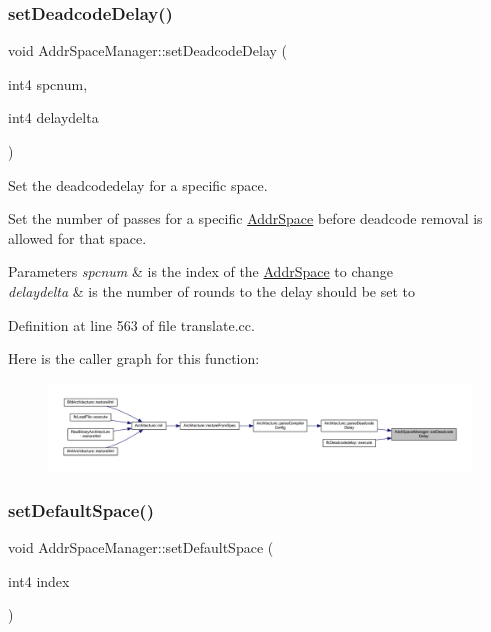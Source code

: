 \subsubsection{\texorpdfstring{setDeadcodeDelay()}{setDeadcodeDelay()}}
{\footnotesize\ttfamily void Addr\+Space\+Manager\+::set\+Deadcode\+Delay (\begin{DoxyParamCaption}\item[{int4}]{spcnum,  }\item[{int4}]{delaydelta }\end{DoxyParamCaption})}



Set the deadcodedelay for a specific space. 

Set the number of passes for a specific \mbox{\hyperlink{class_addr_space}{Addr\+Space}} before deadcode removal is allowed for that space. 
\begin{DoxyParams}{Parameters}
{\em spcnum} & is the index of the \mbox{\hyperlink{class_addr_space}{Addr\+Space}} to change \\
\hline
{\em delaydelta} & is the number of rounds to the delay should be set to \\
\hline
\end{DoxyParams}


Definition at line 563 of file translate.\+cc.

Here is the caller graph for this function\+:
\nopagebreak
\begin{figure}[H]
\begin{center}
\leavevmode
\includegraphics[width=350pt]{class_addr_space_manager_a309aefdf92c8a631096916128772a116_icgraph}
\end{center}
\end{figure}
\mbox{\label{class_addr_space_manager_aa2804a97aa4900bf84f0c2ff064847ec}} 
\subsubsection{\texorpdfstring{setDefaultSpace()}{setDefaultSpace()}}
{\footnotesize\ttfamily void Addr\+Space\+Manager\+::set\+Default\+Space (\begin{DoxyParamCaption}\item[{int4}]{index }\end{DoxyParamCaption})\hspace{0.3cm}{\ttfamily [protected]}}



